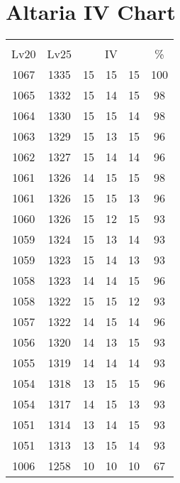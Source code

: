 \documentclass{article}%
\begin{document}
%
\normalsize%
\section{Altaria IV Chart}%
\label{sec:Altaria IV Chart}%
\renewcommand{\arraystretch}{1.5}%
\begin{tabular}{|c|c|c|c|c|c|}%
\hline%
\multicolumn{6}{|c|}{\textcolor{white}{ 
\linebreak{Altaria}
}%
\cellcolor{black}}\\%
\multicolumn{1}{|c}{Lv20}&\multicolumn{1}{c|}{Lv25}&\multicolumn{3}{c|}{IV}&\multicolumn{1}{|c|}{\%}\\%
\hline%
\rowcolor{color100}%
1067&1335&15&15&15&100\\%
\hline%
\rowcolor{color98}%
1065&1332&15&14&15&98\\%
\hline%
\rowcolor{color98}%
1064&1330&15&15&14&98\\%
\hline%
\rowcolor{color96}%
1063&1329&15&13&15&96\\%
\hline%
\rowcolor{color96}%
1062&1327&15&14&14&96\\%
\hline%
\rowcolor{color98}%
1061&1326&14&15&15&98\\%
\hline%
\rowcolor{color96}%
1061&1326&15&15&13&96\\%
\hline%
\rowcolor{color93}%
1060&1326&15&12&15&93\\%
\hline%
\rowcolor{color93}%
1059&1324&15&13&14&93\\%
\hline%
\rowcolor{color93}%
1059&1323&15&14&13&93\\%
\hline%
\rowcolor{color96}%
1058&1323&14&14&15&96\\%
\hline%
\rowcolor{color93}%
1058&1322&15&15&12&93\\%
\hline%
\rowcolor{color96}%
1057&1322&14&15&14&96\\%
\hline%
\rowcolor{color93}%
1056&1320&14&13&15&93\\%
\hline%
\rowcolor{color93}%
1055&1319&14&14&14&93\\%
\hline%
\rowcolor{color96}%
1054&1318&13&15&15&96\\%
\hline%
\rowcolor{color93}%
1054&1317&14&15&13&93\\%
\hline%
\rowcolor{color93}%
1051&1314&13&14&15&93\\%
\hline%
\rowcolor{color93}%
1051&1313&13&15&14&93\\%
\hline%
\rowcolor{color91}%
1006&1258&10&10&10&67\\%
\end{tabular}

%
\end{document}
